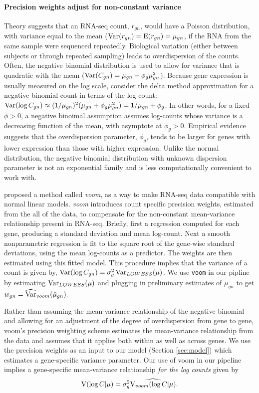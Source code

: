 \paragraph{Precision weights adjust for non-constant variance}
Theory suggests that an RNA-seq count, $r_{gn}$, would have a Poisson distribution, with variance equal to the mean ($\operatorname{Var}(r_{gn})=\operatorname{E}(r_{gn})=\mu_{gn}$, if the RNA from the same sample were sequenced repeatedly. Biological variation (either between subjects or through repeated sampling) leads to overdispersion of the counts. Often, the negative binomial distribution is used to allow for variance that is quadratic with the mean ($\operatorname{Var}(C_{gn})=\mu_{gn}+\phi_g\mu_{gn}^2$). Because gene expression is usually measured on the log scale, consider the delta method  approximation for a negative binomial count in terms of the log-count: $\operatorname{Var}(\log C_{gn}) \approx (1/\mu_{gn})^2(\mu_{gn} + \phi_g\mu_{gn}^2)=1/\mu_{gn} + \phi_g$. In other words, for a fixed $\phi>0$, a negative binoimal assumption assumes log-counts whose variance is a decreasing function of the mean, with asymptote at $\phi_g>0$. Empirical evidence \citep{voom} suggests that the overdispersion parameter, $\phi_g$, tends to be larger for genes with lower expression than those with higher expression. Unlike the normal distribution, the negative binomial distribution with unknown dispersion parameter is not an exponential family and is less computationally convenient to work with.

\cite{voom} proposed a method called \textit{voom}, as a way to make RNA-seq data compatible with normal linear models. \textit{voom} introduces count specific precision weights, estimated from the all of the data, to compensate for the non-constant mean-variance relationship present in RNA-seq. Briefly, first a regression computed for each gene, producing a standard deviation and mean log-count. Next a smooth nonparametric regression is fit to the square root of the gene-wise standard deviations, using the mean log-counts as a predictor. The weights are then estimated using this fitted model. This procedure implies that the variance of a count is given by, $\operatorname{Var}(\log C_{gn})=\sigma_{g}^2\operatorname{Var}_{LOWESS}(\mu)$. We use \texttt{voom} in our pipline by estimating $\operatorname{Var}_{LOWESS}(\mu)$ and plugging in preliminary estimates of $\mu_{gn}$ to get $w_{gn} = \widehat{\operatorname{Var}}_{voom}(\hat{\mu}_{gn}).$

Rather than assuming the mean-variance relationship of the negative binomial and allowing for an adjustment of the degree of overdispersion from gene to gene, voom's precision weighting scheme estimates the mean-variance relationship from the data and assumes that it applies both within as well as across genes. We use the precision weights as an input to our model (Section \ref{sec:model}) which estimates a gene-specific variance parameter. Our use of voom in our pipeline implies a gene-specific mean-variance relationship \textit{for the log counts} given by
$$\operatorname{V}(\log C|\mu)=\sigma^2_g \widehat{\operatorname{V}_{voom}(\log C|\mu)}.$$

